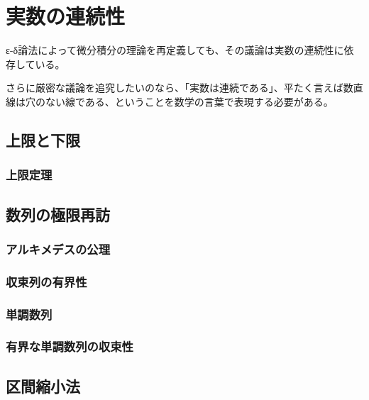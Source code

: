 \documentclass[../math-imaging]{subfiles}
\begin{document}
\chapter{実数の連続性}

ε-δ論法によって微分積分の理論を再定義しても、その議論は実数の連続性に依存している。

さらに厳密な議論を追究したいのなら、「実数は連続である」、平たく言えば数直線は穴のない線である、ということを数学の言葉で表現する必要がある。

\section{上限と下限}

\subsection{上限定理}


\section{数列の極限再訪}

\subsection{アルキメデスの公理}


\subsection{収束列の有界性}


\subsection{単調数列}


\subsection{有界な単調数列の収束性}


\section{区間縮小法}
\end{document}
